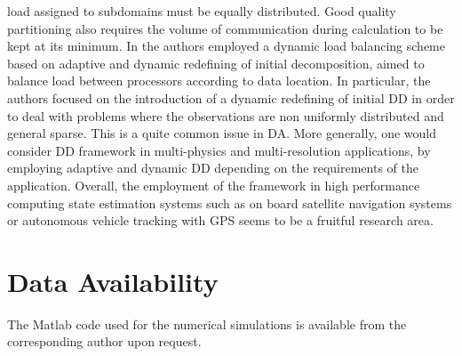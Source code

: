 \documentclass[smallcondensed]{svjour3}
\begin{document}
load assigned to subdomains must be equally distributed. Good quality partitioning also requires the volume of communication during
calculation to be kept at its minimum. In \cite{arxivPPAM2019,DyDD} the authors  employed a dynamic load balancing scheme based
on  adaptive and dynamic redefining of initial decomposition,   aimed to balance load between processors according to data
location.  In particular, the authors
focused on the introduction of a dynamic redefining of initial DD in order to deal with problems where the observations are non uniformly distributed and general sparse. This is a quite common issue in DA. More generally, one would consider DD framework in multi-physics and multi-resolution applications, by employing  adaptive and dynamic DD depending on the requirements of the application.   Overall, the employment of the framework in high performance computing state estimation systems such as on board  satellite navigation systems or autonomous vehicle tracking with GPS seems to be a fruitful research area. 
\section{Data Availability}
The Matlab code used for the numerical simulations is available from the corresponding author upon request.



\end{document}
